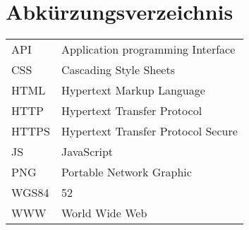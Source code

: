 \documentclass[a4paper, twoside, 12pt]{scrreprt}
\begin{document}
\section{Abkürzungsverzeichnis}
\begin{tabular}{ll}
	API		&Application programming Interface\\
	CSS		&Cascading Style Sheets\\
	HTML	&Hypertext Markup Language\\
	HTTP	&Hypertext Transfer Protocol\\
	HTTPS	&Hypertext Transfer Protocol Secure\\
	JS		&JavaScript\\
	PNG		&Portable Network Graphic\\
	WGS84	&52\\
	WWW		&World Wide Web\\
\end{tabular}

{}

\end{document}
